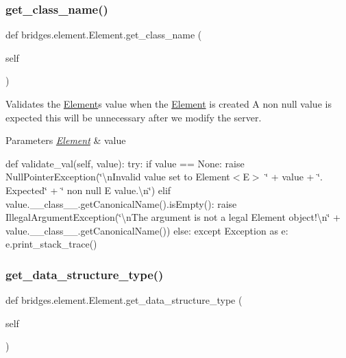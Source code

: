 \subsubsection{\texorpdfstring{get\+\_\+class\+\_\+name()}{get\_class\_name()}}
{\footnotesize\ttfamily def bridges.\+element.\+Element.\+get\+\_\+class\+\_\+name (\begin{DoxyParamCaption}\item[{}]{self }\end{DoxyParamCaption})}



Validates the \mbox{\hyperlink{classbridges_1_1element_1_1_element}{Element}}\textquotesingle{}s value when the \mbox{\hyperlink{classbridges_1_1element_1_1_element}{Element}} is created A non null value is expected this will be unnecessary after we modify the server. 


\begin{DoxyParams}{Parameters}
{\em \mbox{\hyperlink{classbridges_1_1element_1_1_element}{Element}}} & value\\
\hline
\end{DoxyParams}
def validate\+\_\+val(self, value)\+: try\+: if value == None\+: raise Null\+Pointer\+Exception(\char`\"{}\textbackslash{}n\+Invalid value set to Element$<$\+E$>$ \textquotesingle{}\char`\"{} + value + \char`\"{}\textquotesingle{}. Expected\char`\"{} + \char`\"{} non null E value.\textbackslash{}n\char`\"{}) elif value.\+\_\+\+\_\+class\+\_\+\+\_\+.\+get\+Canonical\+Name().is\+Empty()\+: raise Illegal\+Argument\+Exception(\char`\"{}\textbackslash{}n\+The argument is not a legal Element object!\textbackslash{}n\char`\"{} + value.\+\_\+\+\_\+class\+\_\+\+\_\+.\+get\+Canonical\+Name()) else\+: except Exception as e\+: e.\+print\+\_\+stack\+\_\+trace() \mbox{\label{classbridges_1_1element_1_1_element_a87b8c79123d20eb2af48ae4e4f1bcf32}} 
\subsubsection{\texorpdfstring{get\+\_\+data\+\_\+structure\+\_\+type()}{get\_data\_structure\_type()}}
{\footnotesize\ttfamily def bridges.\+element.\+Element.\+get\+\_\+data\+\_\+structure\+\_\+type (\begin{DoxyParamCaption}\item[{}]{self }\end{DoxyParamCaption})}

